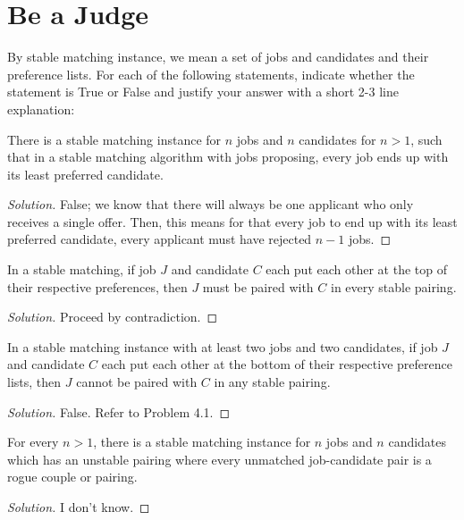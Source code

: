 \documentclass[openany]{book}
\newenvironment{solution}{\begin{proof}[Solution]}{\end{proof}}
\begin{document}
\section{Be a Judge}
By stable matching instance, we mean a set of jobs and candidates and their preference lists. For each of the following statements, indicate whether the statement is True or False and justify your answer with a short 2-3 line explanation:
\begin{hw}
	There is a stable matching instance for $n$ jobs and $n$ candidates for $n > 1$, such that in a stable matching algorithm with jobs proposing, every job ends up with its least preferred candidate.
\end{hw}
\begin{solution}
	False; we know that there will always be one applicant who only receives a single offer. Then, this means for that every job to end up with its least preferred candidate, every applicant must have rejected $n-1$ jobs.
\end{solution}
\begin{hw}
	In a stable matching, if job $J$ and candidate $C$ each put each other at the top of their respective preferences, then $J$ must be paired with $C$ in every stable pairing.
\end{hw}
\begin{solution}
	Proceed by contradiction.
\end{solution}
\begin{hw}
	In a stable matching instance with at least two jobs and two candidates, if job $J$ and candidate $C$ each put each other at the bottom of their respective preference lists, then $J$ cannot be paired with $C$ in any stable pairing.
\end{hw}
\begin{solution}
	False. Refer to Problem 4.1.
\end{solution}
\begin{hw}
	For every $n > 1$, there is a stable matching instance for $n$ jobs and $n$ candidates which has an unstable pairing where every unmatched job-candidate pair is a rogue couple or pairing.
\end{hw}
\begin{solution}
	I don't know.
\end{solution}
\end{document}
